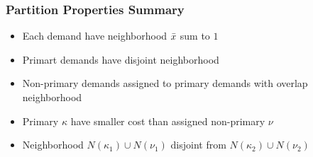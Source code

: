 \documentclass[handout, hyperref, dvipsnames]{beamer}
\begin{document}
\begin{frame}
  \frametitle{Partition Properties Summary}
  \begin{itemize}
    \addtolength{\itemsep}{1\baselineskip}
  \item \large{Each demand have neighborhood ${\bar x}$ sum to $1$}
  \item \large{Primart demands have disjoint neighborhood}
  \item \large{Non-primary demands assigned to primary demands with overlap neighborhood}
  \item \large{Primary $\kappa$ have smaller cost than assigned non-primary $\nu$}
  \item \large{Neighborhood $N(\kappa_1) \cup N(\nu_1)$ disjoint from $N(\kappa_2) \cup N(\nu_2)$}
  \end{itemize}
\end{frame}
\end{document}
